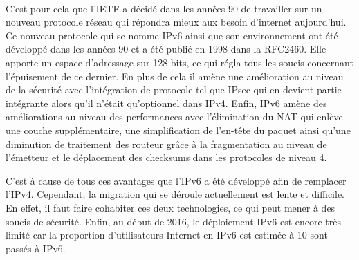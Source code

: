 \\
C'est pour cela que l'IETF a décidé dans les années 90 de travailler sur un nouveau protocole 
réseau qui répondra mieux aux besoin d'internet aujourd'hui. Ce nouveau protocole qui se nomme
IPv6 ainsi que son environnement ont été développé dans les années 90 et a été publié en 1998
 dans la RFC2460. Elle apporte un espace d'adressage sur 128 bits, ce qui régla tous les soucis
 concernant l'épuisement de ce dernier. 
En plus de cela il amène une amélioration au niveau de la sécurité avec l'intégration de protocole
 tel que IPsec qui en devient partie intégrante alors qu'il n'était qu'optionnel dans IPv4. Enfin,
 IPv6 amène des améliorations au niveau des performances avec l'élimination du NAT qui enlève une
 couche supplémentaire, une simplification de l'en-tête du paquet ainsi qu'une diminution de
 traitement des routeur grâce à la fragmentation au niveau de l'émetteur et le déplacement des
 checksums dans les protocoles de niveau 4.

C'est à cause de tous ces avantages que l'IPv6 a été développé afin de remplacer l'IPv4. 
Cependant, la migration qui se déroule actuellement est lente et difficile. En effet, il 
faut faire cohabiter ces deux technologies, ce qui peut mener à des soucis de sécurité. Enfin, au 
début de 2016, le déploiement IPv6 est encore très limité car la proportion d'utilisateurs Internet en
 IPv6 est estimée à 10%
sont passés à IPv6.



